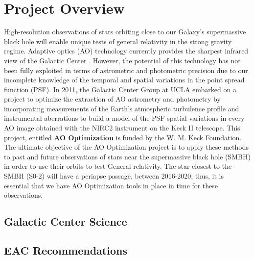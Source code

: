 \section{Project Overview}

High-resolution observations of stars orbiting close to our Galaxy's supermassive black hole will enable unique tests of general relativity in the strong gravity regime. Adaptive optics (AO) technology currently provides the sharpest infrared view of the Galactic Center \cite{Ghez_2005}. However, the potential of this technology has not been fully exploited in terms of astrometric and photometric precision due to our incomplete knowledge of the temporal and spatial variations in the point spread function (PSF). In 2011, the Galactic Center Group at UCLA embarked on a project to optimize the extraction of AO astrometry and photometry by incorporating measurements of the Earth's atmospheric turbulence profile and instrumental aberrations to build a model of the PSF spatial variations in every AO image obtained with the NIRC2 instrument on the Keck II telescope. This project, entitled \textbf{AO Optimization} is funded by the W. M. Keck Foundation. The ultimate objective of the AO Optimization project is to apply these methods to past and future observations of stars near the supermassive black hole (SMBH) in order to use their orbits to test General relativity. The star closest to the SMBH (S0-2) will have a periapse passage, between 2016-2020; thus, it is essential that we have AO Optimization tools in place in time for these observations. 

\subsection{Galactic Center Science}


\subsection{EAC Recommendations}

